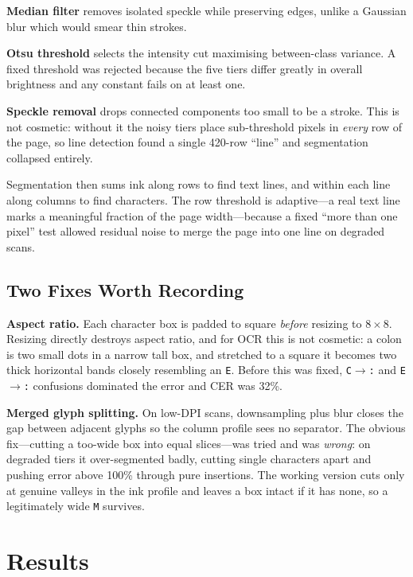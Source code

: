 \documentclass[11pt,a4paper]{article}
\begin{document}
\textbf{Median filter} removes isolated speckle while preserving edges, unlike a
Gaussian blur which would smear thin strokes.

\textbf{Otsu threshold} selects the intensity cut maximising between-class
variance. A fixed threshold was rejected because the five tiers differ greatly in
overall brightness and any constant fails on at least one.

\textbf{Speckle removal} drops connected components too small to be a stroke.
This is not cosmetic: without it the noisy tiers place sub-threshold pixels in
\emph{every} row of the page, so line detection found a single 420-row ``line''
and segmentation collapsed entirely.

Segmentation then sums ink along rows to find text lines, and within each line
along columns to find characters. The row threshold is adaptive---a real text
line marks a meaningful fraction of the page width---because a fixed
``more than one pixel'' test allowed residual noise to merge the page into one
line on degraded scans.

\subsection{Two Fixes Worth Recording}

\textbf{Aspect ratio.} Each character box is padded to square \emph{before}
resizing to $8\times8$. Resizing directly destroys aspect ratio, and for OCR this
is not cosmetic: a colon is two small dots in a narrow tall box, and stretched to
a square it becomes two thick horizontal bands closely resembling an
\texttt{E}. Before this was fixed, \texttt{C}$\rightarrow$\texttt{:} and
\texttt{E}$\rightarrow$\texttt{:} confusions dominated the error and CER was
32\%.

\textbf{Merged glyph splitting.} On low-DPI scans, downsampling plus blur closes
the gap between adjacent glyphs so the column profile sees no separator. The
obvious fix---cutting a too-wide box into equal slices---was tried and was
\emph{wrong}: on degraded tiers it over-segmented badly, cutting single
characters apart and pushing error above 100\% through pure insertions. The
working version cuts only at genuine valleys in the ink profile and leaves a box
intact if it has none, so a legitimately wide \texttt{M} survives.

\section{Results}
\end{document}
